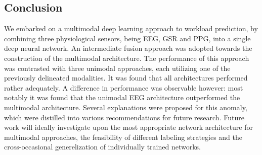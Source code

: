 \documentclass[12pt]{article}
\begin{document}
\subsection{Conclusion}
We embarked on a multimodal deep learning approach to workload prediction, by combining three physiological sensors, being EEG, GSR and PPG, into a single deep neural network. An intermediate fusion approach was adopted towards the construction of the multimodal architecture. The performance of this approach was contrasted with three unimodal approaches, each utilizing one of the previously delineated modalities. It was found that all architectures performed rather adequately. A difference in performance was observable however: most notably it was found that the unimodal EEG architecture outperformed the multimodal architecture. Several explanations were proposed for this anomaly, which were distilled into various recommendations for future research. Future work will ideally investigate upon the most appropriate network architecture for multimodal approaches,  the feasibility of different labeling strategies and the cross-occasional generelization of individually trained networks. 

\newpage


\end{document}
